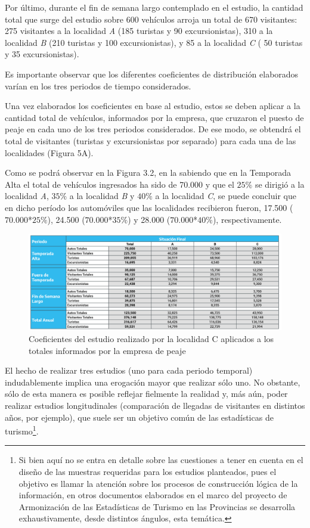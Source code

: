 \documentclass[
]{book}
\begin{document}
Por último, durante el fin de semana largo contemplado en el estudio, la cantidad total que surge del estudio sobre 600 vehículos arroja un total de 670 visitantes: 275 visitantes a la localidad \emph{A} (185 turistas y 90 excursionistas), 310 a la localidad \emph{B} (210 turistas y 100 excursionistas), y 85 a la localidad \emph{C} ( 50 turistas y 35 excursionistas).

Es importante observar que los diferentes coeficientes de distribución elaborados varían en los tres periodos de tiempo considerados.

Una vez elaborados los coeficientes en base al estudio, estos se deben aplicar a la cantidad total de vehículos, informados por la empresa, que cruzaron el puesto de peaje en cada uno de los tres periodos considerados. De ese modo, se obtendrá el total de visitantes (turistas y excursionistas por separado) para cada una de las localidades (Figura 5A).

Como se podrá observar en la Figura 3.2, en la sabiendo que en la Temporada Alta el total de vehículos ingresados ha sido de 70.000 y que el \(25\%\) se dirigió a la localidad \emph{A}, \(35\%\) a la localidad \emph{B} y \(40\%\) a la localidad \emph{C}, se puede concluir que en dicho período los automóviles que las localidades recibieron fueron, 17.500 (\(70.000\)*\(25\%\)), 24.500 (\(70.000\)*\(35\%\)) y 28.000 (\(70.000\)*\(40\%\)), respectivamente.

\begin{figure}

{\centering \includegraphics[width=1\linewidth]{imagenes/figura5A} 

}

\caption{Coeficientes del estudio realizado por la localidad C aplicados a los totales informados por la empresa de peaje}\label{fig:coeficientes}
\end{figure}

El hecho de realizar tres estudios (uno para cada periodo temporal) indudablemente implica una erogación mayor que realizar sólo uno. No obstante, sólo de esta manera es posible reflejar fielmente la realidad y, más aún, poder realizar estudios longitudinales (comparación de llegadas de visitantes en distintos años, por ejemplo), que suele ser un objetivo común de las estadísticas de turismo\footnote{Si bien aquí no se entra en detalle sobre las cuestiones a tener en cuenta en el diseño de las muestras requeridas para los estudios planteados, pues el objetivo es llamar la atención sobre los procesos de construcción lógica de la información, en otros documentos elaborados en el marco del proyecto de Armonización de las Estadísticas de Turismo en las Provincias se desarrolla exhaustivamente, desde distintos ángulos, esta temática.}.
\end{document}
